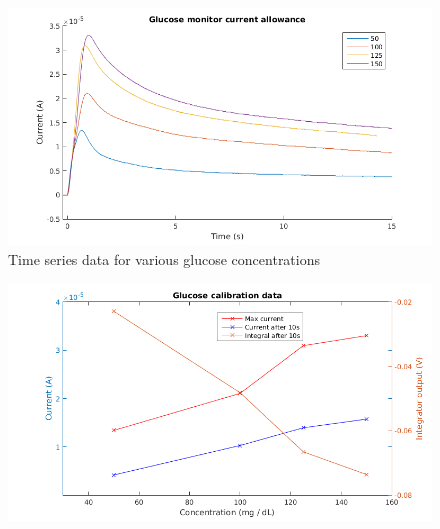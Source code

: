 \documentclass[11pt]{article} %
\begin{document}
\begin{figure}[]
	\centering
	\includegraphics[width=\textwidth]{glucose_currents.png}
	\caption{Time series data for various glucose concentrations}
 	\label{fig:gcurrent}
\end{figure}

\begin{figure}[]
	\centering
	\includegraphics[width=\textwidth]{glucose_calibration.png}
	\caption{}
 	\label{fig:gcal}
\end{figure}
\end{document}
